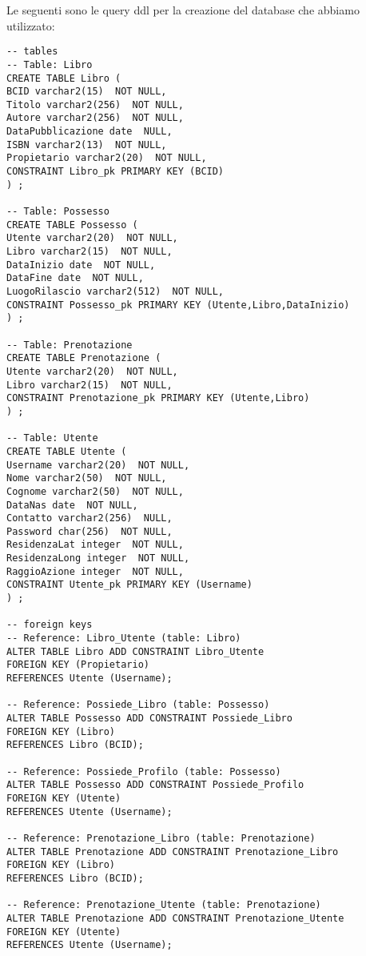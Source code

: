 Le seguenti sono le query ddl per la creazione del database che abbiamo utilizzato:
\begin{lstlisting}
-- tables
-- Table: Libro
CREATE TABLE Libro (
BCID varchar2(15)  NOT NULL,
Titolo varchar2(256)  NOT NULL,
Autore varchar2(256)  NOT NULL,
DataPubblicazione date  NULL,
ISBN varchar2(13)  NOT NULL,
Propietario varchar2(20)  NOT NULL,
CONSTRAINT Libro_pk PRIMARY KEY (BCID)
) ;

-- Table: Possesso
CREATE TABLE Possesso (
Utente varchar2(20)  NOT NULL,
Libro varchar2(15)  NOT NULL,
DataInizio date  NOT NULL,
DataFine date  NOT NULL,
LuogoRilascio varchar2(512)  NOT NULL,
CONSTRAINT Possesso_pk PRIMARY KEY (Utente,Libro,DataInizio)
) ;

-- Table: Prenotazione
CREATE TABLE Prenotazione (
Utente varchar2(20)  NOT NULL,
Libro varchar2(15)  NOT NULL,
CONSTRAINT Prenotazione_pk PRIMARY KEY (Utente,Libro)
) ;

-- Table: Utente
CREATE TABLE Utente (
Username varchar2(20)  NOT NULL,
Nome varchar2(50)  NOT NULL,
Cognome varchar2(50)  NOT NULL,
DataNas date  NOT NULL,
Contatto varchar2(256)  NULL,
Password char(256)  NOT NULL,
ResidenzaLat integer  NOT NULL,
ResidenzaLong integer  NOT NULL,
RaggioAzione integer  NOT NULL,
CONSTRAINT Utente_pk PRIMARY KEY (Username)
) ;

-- foreign keys
-- Reference: Libro_Utente (table: Libro)
ALTER TABLE Libro ADD CONSTRAINT Libro_Utente
FOREIGN KEY (Propietario)
REFERENCES Utente (Username);

-- Reference: Possiede_Libro (table: Possesso)
ALTER TABLE Possesso ADD CONSTRAINT Possiede_Libro
FOREIGN KEY (Libro)
REFERENCES Libro (BCID);

-- Reference: Possiede_Profilo (table: Possesso)
ALTER TABLE Possesso ADD CONSTRAINT Possiede_Profilo
FOREIGN KEY (Utente)
REFERENCES Utente (Username);

-- Reference: Prenotazione_Libro (table: Prenotazione)
ALTER TABLE Prenotazione ADD CONSTRAINT Prenotazione_Libro
FOREIGN KEY (Libro)
REFERENCES Libro (BCID);

-- Reference: Prenotazione_Utente (table: Prenotazione)
ALTER TABLE Prenotazione ADD CONSTRAINT Prenotazione_Utente
FOREIGN KEY (Utente)
REFERENCES Utente (Username);
\end{lstlisting}

